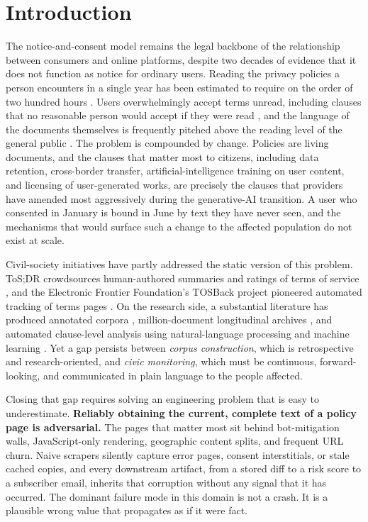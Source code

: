 \documentclass[11pt]{article}
\begin{document}
\section{Introduction}
\label{sec:intro}

The notice-and-consent model remains the legal backbone of the relationship
between consumers and online platforms, despite two decades of evidence that it
does not function as notice for ordinary users. Reading the privacy policies a
person encounters in a single year has been estimated to require on the order of
two hundred hours \cite{mcdonald2008cost}. Users overwhelmingly accept terms
unread, including clauses that no reasonable person would accept if they were
read \cite{obar2020biggest}, and the language of the documents themselves is
frequently pitched above the reading level of the general public
\cite{fabian2017readability, reidenberg2015disagreeable}. The problem is
compounded by change. Policies are living documents, and the clauses that matter
most to citizens, including data retention, cross-border transfer,
artificial-intelligence training on user content, and licensing of
user-generated works, are precisely the clauses that providers have amended most
aggressively during the generative-AI transition. A user who consented in
January is bound in June by text they have never seen, and the mechanisms that
would surface such a change to the affected population do not exist at scale.

Civil-society initiatives have partly addressed the static version of this
problem. ToS;DR crowdsources human-authored summaries and ratings of terms of
service \cite{tosdr}, and the Electronic Frontier Foundation's TOSBack project
pioneered automated tracking of terms pages \cite{tosback}. On the research side,
a substantial literature has produced annotated corpora \cite{wilson2016creation},
million-document longitudinal archives \cite{amos2021privacy}, and automated
clause-level analysis using natural-language processing and machine learning
\cite{harkous2018polisis, srinath2021privacy, lippi2019claudette,
andow2019policylint, cui2023poligraph}. Yet a gap persists between
\emph{corpus construction}, which is retrospective and research-oriented, and
\emph{civic monitoring}, which must be continuous, forward-looking, and
communicated in plain language to the people affected.

Closing that gap requires solving an engineering problem that is easy to
underestimate. \textbf{Reliably obtaining the current, complete text of a policy
page is adversarial.} The pages that matter most sit behind bot-mitigation
walls, JavaScript-only rendering, geographic content splits, and frequent URL
churn. Naive scrapers silently capture error pages, consent interstitials, or
stale cached copies, and every downstream artifact, from a stored diff to a risk
score to a subscriber email, inherits that corruption without any signal that it
has occurred. The dominant failure mode in this domain is not a crash. It is a
plausible wrong value that propagates as if it were fact.
\end{document}
